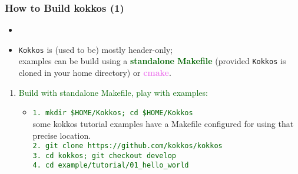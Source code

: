 \begin{frame}
  \frametitle{How to Build kokkos (1)}

  \hypertarget{handson0}{}
  \begin{itemize}
  \item {}
  \item {\tt Kokkos} is (used to be) mostly header-only;\\
     examples can be build using a \textcolor{darkgreen}{\bf standalone Makefile} (provided {\tt Kokkos} is cloned in your home directory) or \textcolor{violet}{\bf cmake}.
  \end{itemize}

  \begin{enumerate}
  \item \textcolor{darkgreen}{Build with standalone Makefile, play with examples:}
     \begin{itemize}
     \item
        \textcolor{darkgreen}{\tt 1. mkdir \$HOME/Kokkos; cd \$HOME/Kokkos}\\
        some kokkos tutorial examples have a Makefile configured for using that precise location.\\
        \textcolor{darkgreen}{\tt 2. git clone https://github.com/kokkos/kokkos}\\
        \textcolor{darkgreen}{\tt 3. cd kokkos; git checkout develop}\\
        \textcolor{darkgreen}{\tt 4. cd example/tutorial/01\_hello\_world}
     \end{itemize}
  \end{enumerate}

\end{frame}

